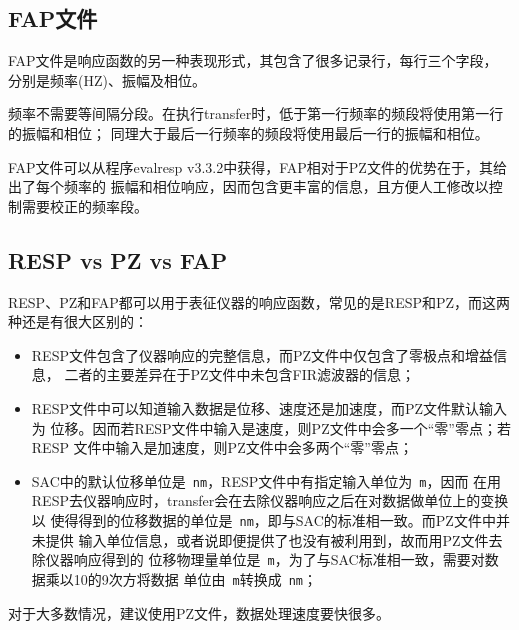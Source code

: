 \subsection{FAP文件}
FAP文件是响应函数的另一种表现形式，其包含了很多记录行，每行三个字段，
分别是频率(HZ)、振幅及相位。

频率不需要等间隔分段。在执行transfer时，低于第一行频率的频段将使用第一行的振幅和相位；
同理大于最后一行频率的频段将使用最后一行的振幅和相位。

FAP文件可以从程序evalresp v3.3.2中获得，FAP相对于PZ文件的优势在于，其给出了每个频率的
振幅和相位响应，因而包含更丰富的信息，且方便人工修改以控制需要校正的频率段。

\subsection{RESP vs PZ vs FAP}
RESP、PZ和FAP都可以用于表征仪器的响应函数，常见的是RESP和PZ，而这两种还是有很大区别的：

\begin{itemize}
\item RESP文件包含了仪器响应的完整信息，而PZ文件中仅包含了零极点和增益信息，
    二者的主要差异在于PZ文件中未包含FIR滤波器的信息；
\item RESP文件中可以知道输入数据是位移、速度还是加速度，而PZ文件默认输入为
    位移。因而若RESP文件中输入是速度，则PZ文件中会多一个``零''零点；若RESP
    文件中输入是加速度，则PZ文件中会多两个``零''零点；
\item SAC中的默认位移单位是~\verb+nm+，RESP文件中有指定输入单位为~\verb+m+，因而
    在用RESP去仪器响应时，transfer会在去除仪器响应之后在对数据做单位上的变换以
    使得得到的位移数据的单位是~\verb+nm+，即与SAC的标准相一致。而PZ文件中并未提供
    输入单位信息，或者说即便提供了也没有被利用到，故而用PZ文件去除仪器响应得到的
    位移物理量单位是~\verb+m+，为了与SAC标准相一致，需要对数据乘以10的9次方将数据
    单位由~\verb+m+转换成~\verb+nm+；
\end{itemize}

对于大多数情况，建议使用PZ文件，数据处理速度要快很多。
